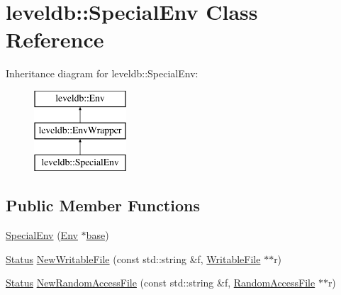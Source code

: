 \hypertarget{classleveldb_1_1_special_env}{}\section{leveldb\+:\+:Special\+Env Class Reference}
\label{classleveldb_1_1_special_env}
Inheritance diagram for leveldb\+:\+:Special\+Env\+:\begin{figure}[H]
\begin{center}
\leavevmode
\includegraphics[height=3.000000cm]{classleveldb_1_1_special_env}
\end{center}
\end{figure}
\subsection*{Public Member Functions}
\begin{DoxyCompactItemize}
\item 
\hyperlink{classleveldb_1_1_special_env_a29fed9502e35a1f9374e0f46f4bd1181}{Special\+Env} (\hyperlink{classleveldb_1_1_env}{Env} $\ast$\hyperlink{testharness_8cc_a70ff0f6c026c3dd1ef6aaf504e7fddc3}{base})
\item 
\hyperlink{classleveldb_1_1_status}{Status} \hyperlink{classleveldb_1_1_special_env_a2a8b88051ccc5f957321d47af0dae5ed}{New\+Writable\+File} (const std\+::string \&f, \hyperlink{classleveldb_1_1_writable_file}{Writable\+File} $\ast$$\ast$r)
\item 
\hyperlink{classleveldb_1_1_status}{Status} \hyperlink{classleveldb_1_1_special_env_ae04ba2b7b94753d805e316dbda74ec00}{New\+Random\+Access\+File} (const std\+::string \&f, \hyperlink{classleveldb_1_1_random_access_file}{Random\+Access\+File} $\ast$$\ast$r)
\end{DoxyCompactItemize}
